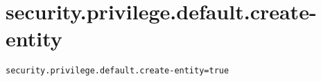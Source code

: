\section{security.privilege.default.create-entity}
\label{configuration:SecurityPrivilegeDefaultCreateEntity}
\ClearAPI
\TODO
{}
\begin{lstlisting}[style=Props,caption={Usage example for \textit{security.privilege.default.create-entity}}]
security.privilege.default.create-entity=true
\end{lstlisting}
